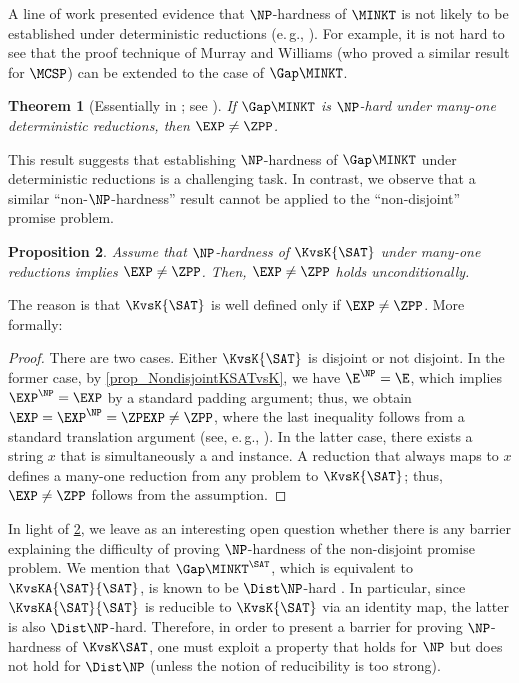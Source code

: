 \documentclass[11pt]{article}
\numberwithin{equation}{section}
\newtheorem{theorem}{Theorem}[section]
\newtheorem{proposition}[theorem]{Proposition}
\theoremstyle{definition}
\theoremstyle{plain}
\newcommand{\eg}{e.\,g.}
\begin{document}
A line of work presented evidence that $\NP$-hardness of $\MINKT$ is not likely to be established under
deterministic reductions (\eg, \cite{Ko91_siamcomp_journals, MurrayW17_toc_journals, HitchcockP15_fsttcs_conf, HiraharaW16_coco_conf}).
For example, it is not hard to see that the proof technique of Murray and Williams \cite{MurrayW17_toc_journals} (who proved a similar result for $\MCSP$)
can be extended to the case of $\Gap\MINKT$.
\begin{theorem}
  [Essentially in \cite{MurrayW17_toc_journals};
    see \cite{Hirahara20_stoc_conf}]  %
  If $\Gap\MINKT$ is $\NP$-hard under many-one deterministic reductions,
  then
  $\EXP \neq \ZPP$.
\end{theorem}
This result suggests that establishing $\NP$-hardness of $\Gap\MINKT$ under deterministic reductions is a challenging task.
In contrast,
we observe that a similar ``non-$\NP$-hardness'' result cannot be applied to
the ``non-disjoint'' promise problem.
\begin{proposition}
  \label{prop_NoNonNPhardness}
  Assume that
  $\NP$-hardness of $\KvsK{\SAT}$
  under many-one reductions
  implies $\EXP \neq \ZPP$.
  Then, $\EXP \neq \ZPP$ holds unconditionally.
\end{proposition}
The reason is that $\KvsK{\SAT}$ is well defined only if $\EXP \neq \ZPP$.  More formally:
\begin{proof}
  There are two cases.
  Either $\KvsK{\SAT}$ is disjoint or not disjoint.
  In the former case, by \cref{prop_NondisjointKSATvsK}, we have $\E^\NP = \E$,
  which implies $\EXP^\NP = \EXP$ by a standard padding argument;
  thus, we obtain $\EXP = \EXP^\NP = \ZPEXP \neq \ZPP$,
  where the last inequality follows from a standard translation argument (see, \eg, \cite{BuhrmanFS09_icalp_conf}).
  In the latter case, there exists a string $x$ that is simultaneously a \Yes and \No instance.
  A reduction that always maps to $x$ defines a many-one reduction from any problem to
  $\KvsK{\SAT}$; thus, $\EXP \neq \ZPP$ follows from the assumption.
\end{proof}

In light of \cref{prop_NoNonNPhardness}, we leave as an interesting open question whether
there is any barrier explaining
the difficulty of proving $\NP$-hardness of the non-disjoint promise problem.
We mention that
$\Gap\MINKT^\SAT$, which is equivalent to
$\KvsKA{\SAT}{\SAT}$,
is known to be $\Dist\NP$-hard \cite{Hirahara20_stoc_conf}.
In particular, since $\KvsKA{\SAT}{\SAT}$ is reducible to $\KvsK{\SAT}$ via an identity map,
the latter is also $\Dist\NP$-hard.
Therefore, in order to present a barrier for proving $\NP$-hardness of $\KvsK\SAT$,
one must exploit a property that holds for $\NP$ but does not hold for $\Dist\NP$
(unless the notion of reducibility is too strong).
\end{document}
